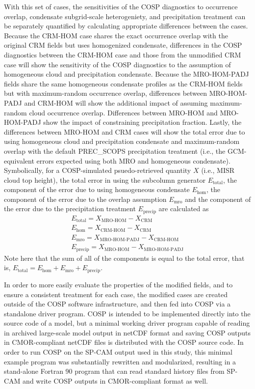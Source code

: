 With this set of cases, the sensitivities of the COSP diagnostics to
occurrence overlap, condensate subgrid-scale heterogeniety, and
precipitation treatment can be separately quantified by calculating
appropriate differences between the cases. Because the CRM-HOM case
shares the exact occurrence overlap with the original CRM fields but
uses homogenized condensate, differences in the COSP diagnostics between
the CRM-HOM case and those from the unmodified CRM case will show the
sensitivity of the COSP diagnostics to the assumption of homogeneous
cloud and precipitation condensate. Because the MRO-HOM-PADJ fields
share the same homogeneous condensate profiles as the CRM-HOM fields but
with maximum-random occurrence overlap, differences between MRO-HOM-PADJ
and CRM-HOM will show the additional impact of assuming maximum-random
cloud occurrence overlap. Differences between MRO-HOM and MRO-HOM-PADJ
show the impact of constraining precipitation fraction. Lastly, the
differences between MRO-HOM and CRM cases will show the total error due
to using homogeneous cloud and precipitation condensate and
maximum-random overlap with the default PREC\_SCOPS precipitation
treatment (i.e., the GCM-equivalent errors expected using both MRO and
homogeneous condensate). Symbolically, for a COSP-simulated
psuedo-retrieved quantity \(X\) (i.e., MISR cloud top height), the total
error in using the subcolumn generator \(E_\textrm{total}\), the
component of the error due to using homogeneous condensate
\(E_\textrm{hom}\), the component of the error due to the overlap
assumption \(E_\textrm{mro}\) and the component of the error due to the
precipitation treatment \(E_\textrm{precip}\) are calculated as
\[\begin{gathered} 
    E_\textrm{total} = X_\textrm{MRO-HOM} - X_\textrm{CRM} \\
    E_\textrm{hom} = X_\textrm{CRM-HOM} - X_\textrm{CRM} \\
    E_\textrm{mro} = X_\textrm{MRO-HOM-PADJ} - X_\textrm{CRM-HOM} \\
    E_\textrm{precip} = X_\textrm{MRO-HOM} - X_\textrm{MRO-HOM-PADJ}
\end{gathered}\] Note here that the sum of all of the components is
equal to the total error, that is,
\(E_\textrm{total} = E_\textrm{hom} + E_\textrm{mro} + E_\textrm{precip}\).

In order to more easily evaluate the properties of the modified fields,
and to ensure a consistent treatment for each case, the modified cases
are created outside of the COSP software infrastructure, and then fed
into COSP via a standalone driver program. COSP is intended to be
implemented directly into the source code of a model, but a minimal
working driver program capable of reading in archived large-scale model
output in netCDF format and saving COSP outputs in CMOR-compliant netCDF
files is distributed with the COSP source code. In order to run COSP on
the SP-CAM output used in this study, this minimal example program was
substantially rewritten and modularized, resulting in a stand-alone
Fortran 90 program that can read standard history files from SP-CAM and
write COSP outputs in CMOR-compliant format as well.

